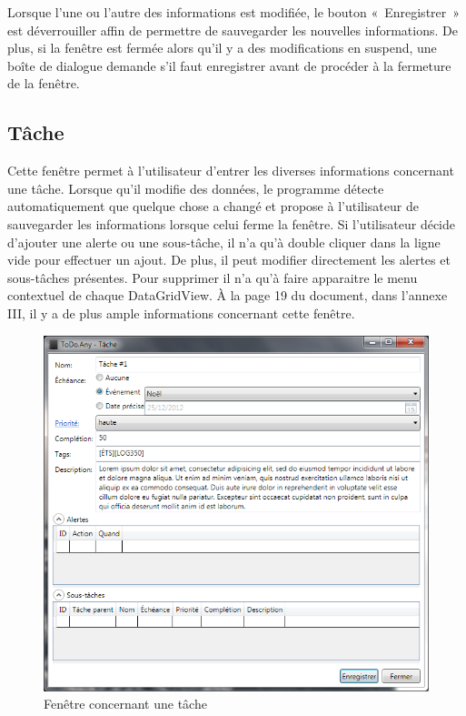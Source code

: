 \documentclass[letterpaper, oneside, 12pt, these, creativecommons]{thETS}
\begin{document}
Lorsque l'une ou l'autre des informations est modifiée, le bouton « Enregistrer » est déverrouiller affin de permettre de sauvegarder les nouvelles informations. De plus, si la fenêtre est fermée alors qu'il y a des modifications en suspend, une boîte de dialogue demande s'il faut enregistrer avant de procéder à la fermeture de la fenêtre.

\subsection{Tâche}

Cette fenêtre permet à l'utilisateur d'entrer les diverses informations concernant une tâche. Lorsque qu'il modifie des données, le programme détecte automatiquement que quelque chose a changé et propose à l'utilisateur de sauvegarder les informations lorsque celui ferme la fenêtre. Si l'utilisateur décide d'ajouter une alerte ou une sous-tâche, il n'a qu'à double cliquer dans la ligne vide pour effectuer un ajout. De plus, il peut modifier directement les alertes et sous-tâches présentes. Pour supprimer il n'a qu'à faire apparaitre le menu contextuel de chaque DataGridView. À la page 19 du document, dans l'annexe III, il y a de plus ample informations concernant cette fenêtre.

\begin{figure}[H!]
	\centering
	\includegraphics[width=1\textwidth]{fenetre_tache.png}
	\caption{Fenêtre concernant une tâche}
\end{figure}
\end{document}
